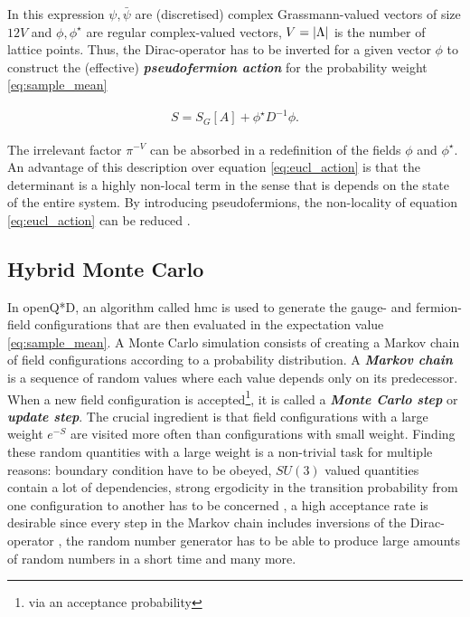\documentclass{article}
\theoremstyle{plain} %
\theoremstyle{convention} %
\theoremstyle{remark} %
\def\df#1{\textbf{\textit{#1}}}
\numberwithin{equation}{section}
\begin{document}
In this expression $\psi, \bar{\psi}$ are (discretised) complex Grassmann-valued vectors of size $12 V$ and $\phi, \phi^{\star}$ are regular complex-valued vectors, $V = \abs{\Lambda}$ is the number of lattice points. Thus, the Dirac-operator has to be inverted for a given vector $\phi$ to construct the (effective) \df{pseudofermion action} for the probability weight \eqref{eq:sample_mean}

\begin{align}
  S = S_G[A] + \phi^{\star} D^{-1} \phi. \label{eq:pseudofermion_action}
\end{align}

The irrelevant factor $\pi^{-V}$ can be absorbed in a redefinition of the fields $\phi$ and $\phi^{\star}$. An advantage of this description over equation \eqref{eq:eucl_action} is that the determinant is a highly non-local term in the sense that is depends on the state of the entire system. By introducing pseudofermions, the non-locality of equation \eqref{eq:eucl_action} can be reduced \cite{fucito1981}.

\subsection{Hybrid Monte Carlo}

In openQ*D, an algorithm called \acrfull{hmc} is used to generate the gauge- and fermion-field configurations that are then evaluated in the expectation value \eqref{eq:sample_mean}. A Monte Carlo simulation consists of creating a Markov chain of field configurations according to a probability distribution. A \df{Markov chain} is a sequence of random values where each value depends only on its predecessor. When a new field configuration is accepted\footnote{via an acceptance probability}, it is called a \df{Monte Carlo step} or \df{update step}. The crucial ingredient is that field configurations with a large weight $e^{-S}$ are visited more often than configurations with small weight. Finding these random quantities with a large weight is a non-trivial task for multiple reasons: boundary condition have to be obeyed, $SU(3)$ valued quantities contain a lot of dependencies, strong ergodicity in the transition probability from one configuration to another has to be concerned \cite{finkler2020,adler1988}, a high acceptance rate is desirable since every step in the Markov chain includes inversions of the Dirac-operator \cite{gupta1990}, the random number generator has to be able to produce large amounts of random numbers in a short time \cite{gentle2003} and many more.
\end{document}
